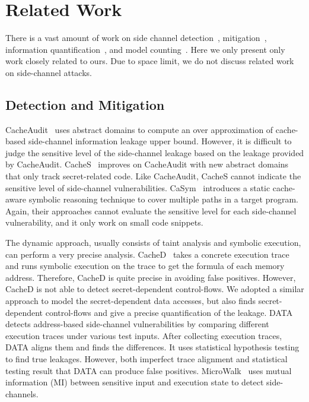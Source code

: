 \section{Related Work}

There is a vast amount of work on 
side channel 
detection~\cite{182946, 236338, Brotzman19Casym, 203878,217537,Wichelmann:2018:MFF:3274694.3274741,langley2010ctgrind}, 
mitigation~\cite{Page2005PartitionedCA,
Wang:2007:NCD:1250662.1250723,Zhang:2015:HDL:2775054.2694372,Li:2014:SLH:2541940.2541947,
236344,shih2017t,Coppens:2009:PMT:1607723.1608124,
brickell2006software,crane2015thwarting}, 
information
quantification~\cite{biondi2018scalable,10.1007/978-3-642-31424-7_40,McCamantE2008,5207642,Phan:2012:SQI:2382756.2382791,Chattopadhyay:2017:QIL:3127041.3127044,zhang2010sidebuster,zhou2018static,pasareanu2016multi}, 
and model counting~\cite{wei2005new, gomes2007sampling, gomes2006model, kroc2008leveraging, Chattopadhyay:2017:QIL:3127041.3127044}.
Here we only present only work closely related to ours.
Due to space limit, we do not discuss related work on side-channel attacks.

\subsection{Detection and Mitigation}

CacheAudit~\cite{182946} uses abstract domains to compute an
over approximation of cache-based side-channel information leakage upper bound.
However, it is difficult to judge the sensitive level of the side-channel leakage based on
the leakage provided by CacheAudit. CacheS~\cite{236338} improves on
CacheAudit with new abstract domains that only track
secret-related code. Like CacheAudit, CacheS cannot
indicate the sensitive level of side-channel vulnerabilities.
CaSym~\cite{Brotzman19Casym} introduces a static cache-aware symbolic
reasoning technique to cover multiple paths in a target program. Again, their
approaches cannot evaluate the sensitive level for each side-channel
vulnerability, and it only work on small code snippets.

The dynamic approach, usually consists of taint analysis and symbolic execution,
can perform a very precise analysis. CacheD~\cite{203878} takes a concrete execution trace and runs symbolic execution on the trace
to get the formula of each memory address. Therefore, CacheD is
quite precise in avoiding false positives. However, CacheD is not able to detect secret-dependent control-flows. We adopted a similar approach to model the secret-dependent data accesses, but \tool{} also finds secret-dependent control-flows and give a precise quantification of the leakage.
DATA~\cite{217537} detects address-based side-channel vulnerabilities by comparing different execution traces under various test inputs. After collecting execution traces, DATA aligns them and finds the differences. It uses statistical hypothesis testing to find true leakages. However, both imperfect trace alignment and statistical testing result that DATA can produce false positives.
MicroWalk~\cite{Wichelmann:2018:MFF:3274694.3274741} uses
mutual information (MI) between sensitive input and execution state to detect side-channels. 

